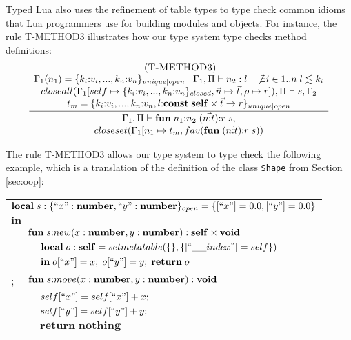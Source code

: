 Typed Lua also uses the refinement of table types to type check
common idioms that Lua programmers use for building modules and objects.
For instance, the rule \textsc{T-METHOD3} illustrates how our type system
type checks method definitions:
\[
\begin{array}{c}
\; (\textsc{T-METHOD3})\\
\dfrac{\begin{array}{c}
       \Gamma_{1}(n_{1}) = \{k_{i}{:}v_{i}, ..., k_{n}{:}v_{n}\}_{unique|open} \;\;\;
       \Gamma_{1}, \Pi \vdash n_{2} : l \;\;\;
       \not \exists i \in 1..n \; l \lesssim k_{i}\\
       closeall(\Gamma_{1}[self \mapsto \{k_{i}{:}v_{i}, ..., k_{n}{:}v_{n}\}_{closed}, \vec{n} \mapsto \vec{t}, \rho \mapsto r]), \Pi \vdash s, \Gamma_{2}\\
       t_{m} = \{k_{i}{:}v_{i}, ..., k_{n}{:}v_{n}, l{:}\mathbf{const} \; \mathbf{self} \times \vec{t} \rightarrow r\}_{unique|open}
       \end{array}}
      {\begin{array}{c}
       \Gamma_{1}, \Pi \vdash \mathbf{fun} \; n_{1}{:}n_{2} \; (\vec{n{:}t}){:}r \; s,\\
       closeset(\Gamma_{1}[n_{1} \mapsto t_{m}, fav(\mathbf{fun} \; (\vec{n{:}t}){:}r \; s))
       \end{array}}
\end{array}
\]

The rule \textsc{T-METHOD3} allows our type system to type check the
following example, which is a translation of the definition of the class
\texttt{Shape} from Section \ref{sec:oop}:
\begin{center}
\begin{tabular}{llll}
\multicolumn{4}{l}{$\mathbf{local} \; s:\{``x":\mathbf{number}, ``y":\mathbf{number}\}_{open} = \{ [``x"] = 0.0, [``y"] = 0.0 \}$}\\
\multicolumn{4}{l}{$\mathbf{in}$}\\
& \multicolumn{3}{l}{$\mathbf{fun} \; s{:}new (x:\mathbf{number}, y:\mathbf{number}):\mathbf{self} \times \mathbf{void}$}\\
& & \multicolumn{2}{l}{$\mathbf{local} \; o:\Self = setmetatable(\{\}, \{ [``\string_\string_index"] = self \})$}\\
& & \multicolumn{2}{l}{$\mathbf{in} \; o[``x"] = x; \; o[``y"] = y; \; \mathbf{return} \; o$}\\
; & \multicolumn{3}{l}{$\mathbf{fun} \; s{:}move (x:\mathbf{number}, y:\mathbf{number}):\mathbf{void}$}\\
& & \multicolumn{2}{l}{$self[``x"] = self[``x"] + x;$}\\
& & \multicolumn{2}{l}{$self[``y"] = self[``y"] + y;$}\\
& & \multicolumn{2}{l}{$\mathbf{return} \; \mathbf{nothing}$}
\end{tabular}
\end{center}

